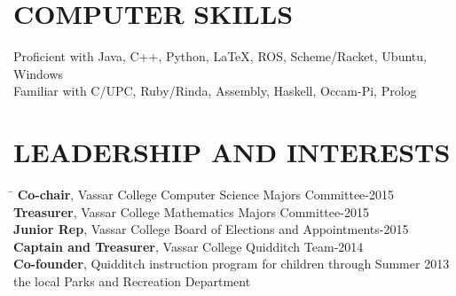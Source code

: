\documentclass{res}
\begin{document}
\begin{resume}
{  \vspace{-3pt}
  \section{COMPUTER SKILLS}
    \vspace{3pt}
      Proficient with Java, C++, Python, LaTeX, ROS, Scheme/Racket,
      Ubuntu, Windows\\
      Familiar with C/UPC, Ruby/Rinda, Assembly, Haskell, Occam-Pi,
      Prolog\\

  \vspace{-18pt}
  \section{LEADERSHIP AND INTERESTS}
    \vspace{-3pt}
    \begin{tabbing}
      \hspace{5in}\=  \kill %
      {\bf Co-chair}, Vassar College Computer Science Majors
          Committee-2015\\
      {\bf Treasurer}, Vassar College Mathematics Majors Committee-2015\\
      {\bf Junior Rep}, Vassar College Board of Elections and
          Appointments-2015\\
      {\bf Captain and Treasurer}, Vassar College Quidditch Team-2014\\
      {\bf Co-founder}, Quidditch instruction program for children
          through\> Summer 2013\\
          \hspace{68pt} the local Parks and Recreation Department\\
    \end{tabbing}
} %
\end{resume}
\end{document}
